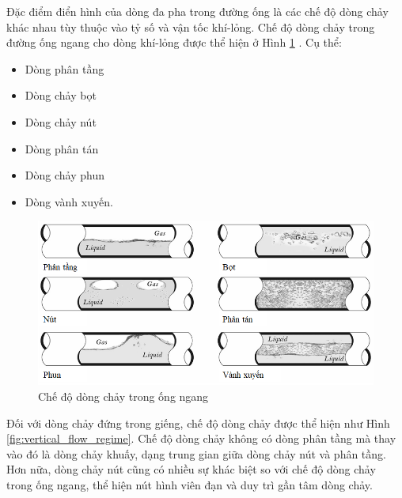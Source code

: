 \documentclass[12pt,a4paper]{report}
\begin{document}
Đặc điểm điển hình của dòng đa pha trong đường ống là các chế độ dòng chảy khác nhau tùy thuộc vào tỷ số và vận tốc khí-lỏng. Chế độ dòng chảy trong đường ống ngang cho dòng khí-lỏng được thể hiện ở Hình \ref{fig:horizontal_flow_regime} \cite{jansen2004modelling}. Cụ thể:
	\begin{itemize}
		\item Dòng phân tầng
		\item Dòng chảy bọt
		\item Dòng chảy nút
		\item Dòng phân tán
		\item Dòng chảy phun
		\item Dòng vành xuyến.
	\end{itemize}
	\begin{figure}[h]
		\centering
		\includegraphics[scale=0.65]{Fig/horizontal_flow_regime.png}
		\caption{Chế độ dòng chảy trong ống ngang}
		\label{fig:horizontal_flow_regime}
	\end{figure}
Đối với dòng chảy đứng trong giếng, chế độ dòng chảy được thể hiện như Hình \ref{fig:vertical_flow_regime}. Chế độ dòng chảy không có dòng phân tầng mà thay vào đó là dòng chảy khuấy, dạng trung gian giữa dòng chảy nút và phân tầng. Hơn nữa, dòng chảy nút cũng có nhiều sự khác biệt so với chế độ dòng chảy trong ống ngang, thể hiện nút hình viên đạn và duy trì gần tâm dòng chảy.
\end{document}
